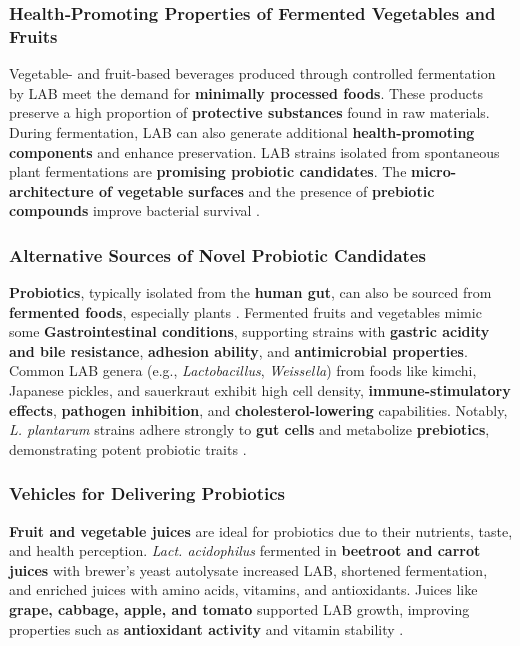 \subsubsection{Health‐Promoting Properties of Fermented Vegetables and Fruits}
Vegetable- and fruit-based beverages produced through controlled fermentation by LAB meet the demand for \textbf{minimally processed foods}. These products preserve a high proportion of \textbf{protective substances} found in raw materials. During fermentation, LAB can also generate additional \textbf{health-promoting components} and enhance preservation. LAB strains isolated from spontaneous plant fermentations are \textbf{promising probiotic candidates}. The \textbf{micro-architecture of vegetable surfaces} and the presence of \textbf{prebiotic compounds} improve bacterial survival \cite*{L8-VegFruit}.

\subsubsection*{Alternative Sources of Novel Probiotic Candidates}
\textbf{Probiotics}, typically isolated from the \textbf{human gut}, can also be sourced from \textbf{fermented foods}, especially plants \cite*{L8-VegFruit}. Fermented fruits and vegetables mimic some \textbf{Gastrointestinal conditions}, supporting strains with \textbf{gastric acidity and bile resistance}, \textbf{adhesion ability}, and \textbf{antimicrobial properties}. Common LAB genera (e.g., \textit{Lactobacillus}, \textit{Weissella}) from foods like kimchi, Japanese pickles, and sauerkraut exhibit high cell density, \textbf{immune-stimulatory effects}, \textbf{pathogen inhibition}, and \textbf{cholesterol-lowering} capabilities. Notably, \textit{L. plantarum} strains adhere strongly to \textbf{gut cells} and metabolize \textbf{prebiotics}, demonstrating potent probiotic traits \cite*{L8-VegFruit}.

\subsubsection*{Vehicles for Delivering Probiotics}
\textbf{Fruit and vegetable juices} are ideal for probiotics due to their nutrients, taste, and health perception. \textit{Lact. acidophilus} fermented in \textbf{beetroot and carrot juices} with brewer's yeast autolysate increased LAB, shortened fermentation, and enriched juices with amino acids, vitamins, and antioxidants. Juices like \textbf{grape, cabbage, apple, and tomato} supported LAB growth, improving properties such as \textbf{antioxidant activity} and vitamin stability \cite*{L8-VegFruit}.

